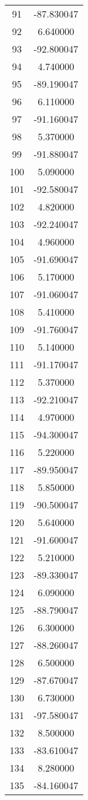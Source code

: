 \documentclass[12pt]{article}
\begin{document}
\begin{longtable}{@{}cc@{}}
91 & -87.830047 \\
92 & 6.640000 \\
93 & -92.800047 \\
94 & 4.740000 \\
95 & -89.190047 \\
96 & 6.110000 \\
97 & -91.160047 \\
98 & 5.370000 \\
99 & -91.880047 \\
100 & 5.090000 \\
101 & -92.580047 \\
102 & 4.820000 \\
103 & -92.240047 \\
104 & 4.960000 \\
105 & -91.690047 \\
106 & 5.170000 \\
107 & -91.060047 \\
108 & 5.410000 \\
109 & -91.760047 \\
110 & 5.140000 \\
111 & -91.170047 \\
112 & 5.370000 \\
113 & -92.210047 \\
114 & 4.970000 \\
115 & -94.300047 \\
116 & 5.220000 \\
117 & -89.950047 \\
118 & 5.850000 \\
119 & -90.500047 \\
120 & 5.640000 \\
121 & -91.600047 \\
122 & 5.210000 \\
123 & -89.330047 \\
124 & 6.090000 \\
125 & -88.790047 \\
126 & 6.300000 \\
127 & -88.260047 \\
128 & 6.500000 \\
129 & -87.670047 \\
130 & 6.730000 \\
131 & -97.580047 \\
132 & 8.500000 \\
133 & -83.610047 \\
134 & 8.280000 \\
135 & -84.160047 \\

\end{longtable}
\end{document}
